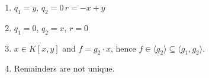 \documentclass[Notebook.tex]{subfiles}
\begin{document}
\begin{solution}
    \bbni
    \begin{enumerate}[label=(\alph*),ref=\theenumi\alph*]
        \item $q_1 = y, \, q_2 = 0 \, r = -x + y$
        \item $q_1 = 0, \, q_2 = x, \, r = 0$
        \item $x \in K[x,y]$ and $f = g_2 \cdot x$, hence $f \in \langle g_2 \rangle \subseteq \langle g_1, g_2 \rangle$. 
        \item Remainders are not unique. 
    \end{enumerate}
\end{solution}
\end{document}
